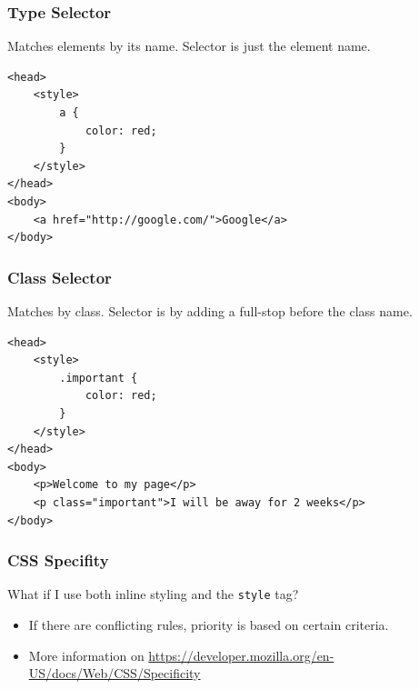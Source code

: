\documentclass[12pt]{beamer}
\begin{document}
\begin{frame}[fragile]
\frametitle{Type Selector}
Matches elements by its name. Selector is just the element name.
\begin{verbatim}
<head>
	<style>
		a {
			color: red;
		}
	</style>
</head>
<body>
	<a href="http://google.com/">Google</a>
</body>
\end{verbatim}
\end{frame}




\begin{frame}[fragile]
\frametitle{Class Selector}
Matches by class. Selector is by adding a full-stop before the class name.
\begin{verbatim}
<head>
	<style>
		.important {
			color: red;
		}
	</style>
</head>
<body>
	<p>Welcome to my page</p>
	<p class="important">I will be away for 2 weeks</p>
</body>
\end{verbatim}
\end{frame}

\begin{frame}
\frametitle{CSS Specifity}
What if I use both inline styling and the \texttt{style} tag?
\begin{itemize}
	\item If there are conflicting rules, priority is based on certain criteria.
	\item More information on \url{https://developer.mozilla.org/en-US/docs/Web/CSS/Specificity}
\end{itemize}
\end{frame}
\end{document}
